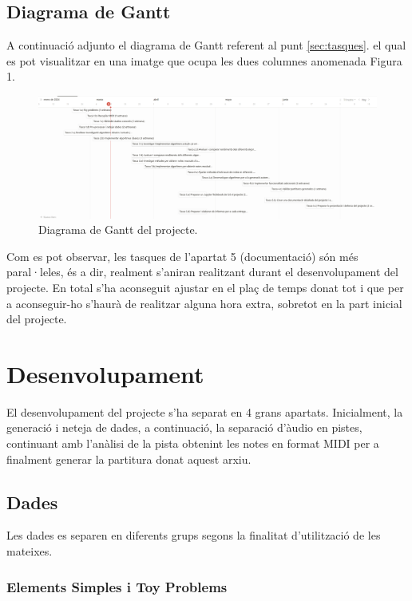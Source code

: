 \documentclass[10pt,a4paper,twocolumn,twoside]{article}
\begin{document}
\subsection{Diagrama de Gantt}
\label{subsec-diagrama-de-Gantt}

A continuació adjunto el diagrama de Gantt referent al punt \ref{sec:tasques}. el qual es pot visualitzar en una imatge que ocupa les dues columnes anomenada Figura 1.
\begin{figure}
    \centering
    \includegraphics[width=\textwidth]{img/Diagrama de Gantt Claro Fecha.png}
    \caption{Diagrama de Gantt del projecte.}
    \label{fig:gantt}
\end{figure}

Com es pot observar, les tasques de l'apartat 5 (documentació) són més paral·leles, és a dir, realment s'aniran realitzant durant el desenvolupament del projecte.
En total s'ha aconseguit ajustar en el plaç de temps donat tot i que per a aconseguir-ho s'haurà de realitzar alguna hora extra, sobretot en la part inicial del projecte.

\section{Desenvolupament}

El desenvolupament del projecte s'ha separat en 4 grans apartats. Inicialment, la generació i neteja de dades, a continuació, la separació d'àudio en pistes, continuant amb l'anàlisi de la pista obtenint les notes en format MIDI per a finalment generar la partitura donat aquest arxiu.

\subsection{Dades}
Les dades es separen en diferents grups segons la finalitat d'utilització de les mateixes.

\subsubsection{Elements Simples i Toy Problems}
\end{document}
